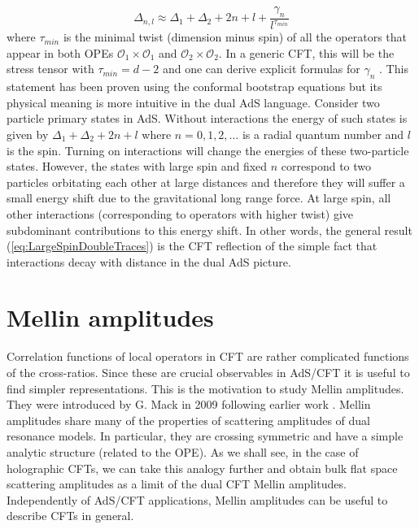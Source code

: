 \documentclass{ws-rv9x6}
\begin{document}
\begin{equation}
\Delta_{n,l}\approx\Delta_{1}+\Delta_{2}+2n+l+\frac{\gamma_{n}}{l^{\tau_{min}}}\label{eq:LargeSpinDoubleTraces}
\end{equation}
where $\tau_{min}$ is the minimal twist (dimension minus spin) of
all the operators that appear in both OPEs $\mathcal{O}_{1}\times\mathcal{O}_{1}$
and $\mathcal{O}_{2}\times\mathcal{O}_{2}$. In a generic CFT, this
will be the stress tensor with $\tau_{min}=d-2$ and one can derive
explicit formulas for $\gamma_{n}$ \cite{arXiv:1212.3616, arXiv:1212.4103, arXiv:1502.01437, arXiv:1504.00772}.
This statement has been proven using the conformal bootstrap equations
but its physical meaning is more intuitive in the dual AdS language.
Consider two particle primary states in AdS. Without interactions
the energy of such states is given by $\Delta_{1}+\Delta_{2}+2n+l$
where $n=0,1,2,\dots$ is a radial quantum number and $l$ is the
spin. Turning on interactions will change the energies of these two-particle
states. However, the states with large spin and fixed $n$ correspond
to two particles orbitating each other at large distances and therefore
they will suffer a small energy shift due to the gravitational long
range force. At large spin, all other interactions (corresponding
to operators with higher twist) give subdominant contributions to
this energy shift. In other words, the general result (\ref{eq:LargeSpinDoubleTraces})
is the CFT reflection of the simple fact that interactions decay with
distance in the dual AdS picture.
 
 
\section{Mellin amplitudes \label{sec:Mellin}}

Correlation functions of local operators in CFT are rather complicated functions of the cross-ratios. Since these are crucial observables in AdS/CFT it is useful to find simpler representations. This is the motivation to study
Mellin amplitudes.
They were introduced by G. Mack in 2009 \cite{Mack:2009mi, Mack:2009gy} following earlier work \cite{Symanzik:1972wj, Dobrev:1975ru}.
Mellin amplitudes share many of the properties of scattering amplitudes of dual resonance models. In particular, they are crossing symmetric and have a simple analytic structure (related to the OPE). As we shall see, in the case of holographic CFTs, we can take this analogy  further and obtain bulk flat space scattering amplitudes as a limit of the dual CFT Mellin amplitudes.
Independently of AdS/CFT applications, Mellin amplitudes can be useful to describe CFTs in general.
\end{document}
